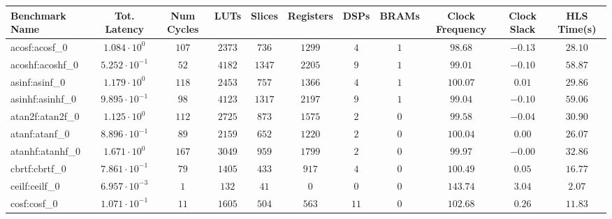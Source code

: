 \begin{tabular}{|l|c|c|c|c|c|c|c|c|c|c|}
\hline
Benchmark Name               & Tot. Latency            & Num Cycles & LUTs      & Slices    & Registers & DSPs    & BRAMs & Clock Frequency & Clock Slack & HLS Time(s) \\
\hline
acosf:acosf\_0               & $ 1.084 \cdot 10^{0}  $ & $ 107    $ & $ 2373  $ & $ 736   $ & $ 1299  $ & $ 4   $ & $ 1 $ & $ 98.68       $ & $ -0.13   $ & $ 28.10   $ \\
acoshf:acoshf\_0             & $ 5.252 \cdot 10^{-1} $ & $ 52     $ & $ 4182  $ & $ 1347  $ & $ 2205  $ & $ 9   $ & $ 1 $ & $ 99.01       $ & $ -0.10   $ & $ 58.87   $ \\
asinf:asinf\_0               & $ 1.179 \cdot 10^{0}  $ & $ 118    $ & $ 2453  $ & $ 757   $ & $ 1366  $ & $ 4   $ & $ 1 $ & $ 100.07      $ & $ 0.01    $ & $ 29.86   $ \\
asinhf:asinhf\_0             & $ 9.895 \cdot 10^{-1} $ & $ 98     $ & $ 4123  $ & $ 1317  $ & $ 2197  $ & $ 9   $ & $ 1 $ & $ 99.04       $ & $ -0.10   $ & $ 59.06   $ \\
atan2f:atan2f\_0             & $ 1.125 \cdot 10^{0}  $ & $ 112    $ & $ 2725  $ & $ 873   $ & $ 1575  $ & $ 2   $ & $ 0 $ & $ 99.58       $ & $ -0.04   $ & $ 30.90   $ \\
atanf:atanf\_0               & $ 8.896 \cdot 10^{-1} $ & $ 89     $ & $ 2159  $ & $ 652   $ & $ 1220  $ & $ 2   $ & $ 0 $ & $ 100.04      $ & $ 0.00    $ & $ 26.07   $ \\
atanhf:atanhf\_0             & $ 1.671 \cdot 10^{0}  $ & $ 167    $ & $ 3049  $ & $ 959   $ & $ 1799  $ & $ 2   $ & $ 0 $ & $ 99.97       $ & $ -0.00   $ & $ 32.86   $ \\
cbrtf:cbrtf\_0               & $ 7.861 \cdot 10^{-1} $ & $ 79     $ & $ 1405  $ & $ 433   $ & $ 917   $ & $ 4   $ & $ 0 $ & $ 100.49      $ & $ 0.05    $ & $ 16.77   $ \\
ceilf:ceilf\_0               & $ 6.957 \cdot 10^{-3} $ & $ 1      $ & $ 132   $ & $ 41    $ & $ 0     $ & $ 0   $ & $ 0 $ & $ 143.74      $ & $ 3.04    $ & $ 2.07    $ \\
cosf:cosf\_0                 & $ 1.071 \cdot 10^{-1} $ & $ 11     $ & $ 1605  $ & $ 504   $ & $ 563   $ & $ 11  $ & $ 0 $ & $ 102.68      $ & $ 0.26    $ & $ 11.83   $ \\

\end{tabular}
